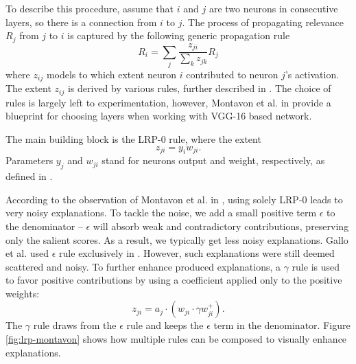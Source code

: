 To describe this procedure, assume that $i$ and $j$ are two neurons in consecutive layers, so there is a connection from $i$ to $j$. 
The process of propagating relevance $R_j$ from $j$ to $i$ is captured by the following generic propagation rule \cite{lrp}
\begin{equation}
    R_i = \sum_j \frac{z_{ji}}{\sum_k z_{jk}} R_j
\end{equation}
where $z_{ij}$ models to which extent neuron $i$ contributed to neuron $j$'s activation.
The extent $z_{ij}$ is derived by various rules, further described in \cite{lrp}.
The choice of rules is largely left to experimentation, however, Montavon et al. in \cite{lrp} provide a blueprint for choosing layers when working with VGG-16 based network.

The main building block is the LRP-$0$ rule, where the extent
\begin{equation}
    z_{ji} = y_i w_{ji}.
\end{equation}
Parameters $y_j$ and $w_{ji}$ stand for neurons output and weight, respectively, as defined in .

According to the observation of Montavon et al. in \cite{lrp}, using solely LRP-$0$ leads to very noisy explanations.
To tackle the noise, we add a small positive term $\epsilon$ to the denominator -- $\epsilon$ will absorb weak and contradictory contributions, preserving only the salient scores. 
As a result, we typically get less noisy explanations.
Gallo et al. used $\epsilon$ rule exclusively in \cite{gallo}.
However, such explanations were still deemed scattered and noisy. To further enhance produced explanations, a $\gamma$ rule is used to favor positive contributions by using a coefficient applied only to the positive weights:
\begin{equation}
    z_{ji} = {a_j \cdot (w_{ji} \cdot \gamma w_{ji}^+)}.
\end{equation}
The $\gamma$ rule draws from the $\epsilon$ rule and keeps the $\epsilon$ term in the denominator.
Figure \ref{fig:lrp-montavon} shows how multiple rules can be composed to visually enhance explanations.

